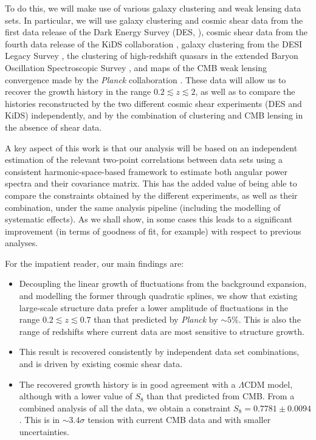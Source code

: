 \documentclass[a4paper,11pt]{article}
\newcommand{\lcdm}{$\Lambda$CDM\xspace}
\newcommand{\des}{DES\xspace}
\newcommand{\kids}{KiDS\xspace}
\newcommand{\planck}{{\sl Planck}\xspace}
\begin{document}
    To do this, we will make use of various galaxy clustering and weak lensing data sets. In particular, we will use galaxy clustering and cosmic shear data from the first data release of the Dark Energy Survey (\des, \cite{1708.01530}), cosmic shear data from the fourth data release of the \kids collaboration \citep{2007.01845}, galaxy clustering from the DESI Legacy Survey \citep{1804.08657,2010.00466}, the clustering of high-redshift quasars in the extended Baryon Oscillation Spectroscopic Survey \citep{2007.08999}, and maps of the CMB weak lensing convergence made by the \planck collaboration \cite{1807.06210}. 
    These data will allow us to recover the growth history in the range $0.2 \lesssim z \lesssim 2$, as well as to compare the histories reconstructed by the two different cosmic shear experiments (\des and \kids) independently, and by the combination of clustering and CMB lensing in the absence of shear data.

    A key aspect of this work is that our analysis will be based on an independent estimation of the relevant two-point correlations between data sets using a consistent harmonic-space-based framework to estimate both angular power spectra and their covariance matrix. This has the added value of being able to compare the constraints obtained by the different experiments, as well as their combination, under the same analysis pipeline (including the modelling of systematic effects). As we shall show, in some cases this leads to a significant improvement (in terms of goodness of fit, for example) with respect to previous analyses.

    For the impatient reader, our main findings are:
    \begin{itemize}
      \item Decoupling the linear growth of fluctuations from the background expansion, and modelling the former through quadratic splines, we show that existing large-scale structure data prefer a lower amplitude of fluctuations in the range $0.2\lesssim z\lesssim0.7$ than that predicted by \planck by $\sim5\%$. This is also the range of redshifts where current data are most sensitive to structure growth.
      \item This result is recovered consistently by independent data set combinations, and is driven by existing cosmic shear data.
      \item The recovered growth history is in good agreement with a \lcdm model, although with a lower value of $S_8$ than that predicted from CMB. From a combined analysis of all the data, we obtain a constraint $S_8=0.7781\pm0.0094$. This is in $\sim3.4\sigma$ tension with current CMB data and with smaller uncertainties.
    \end{itemize}
\end{document}
